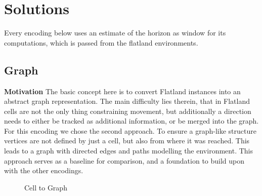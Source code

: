 
\section{Solutions}
Every encoding below uses an estimate of the horizon as window for its computations, which is passed from the flatland environments.

\subsection{Graph}
\noindent \textbf{Motivation} The basic concept here is to convert Flatland instances into an abstract graph representation. The main difficulty lies therein, that in Flatland cells are not the only thing constraining movement, but additionally a direction needs to either be tracked as additional information, or be merged into the graph. For this encoding we chose the second approach. To ensure a graph-like structure vertices are not defined by just a cell, but also from where it was reached. This leads to a graph with directed edges and paths modelling the environment. This approach serves as a baseline for comparison, and a foundation to build upon with the other encodings.\\

\begin{figure}
\begin{minipage}[t]{0.45\textwidth}
    \centering
    \caption{Cell to Graph}
    \label{fig:graph}
\end{minipage}
\end{figure}

